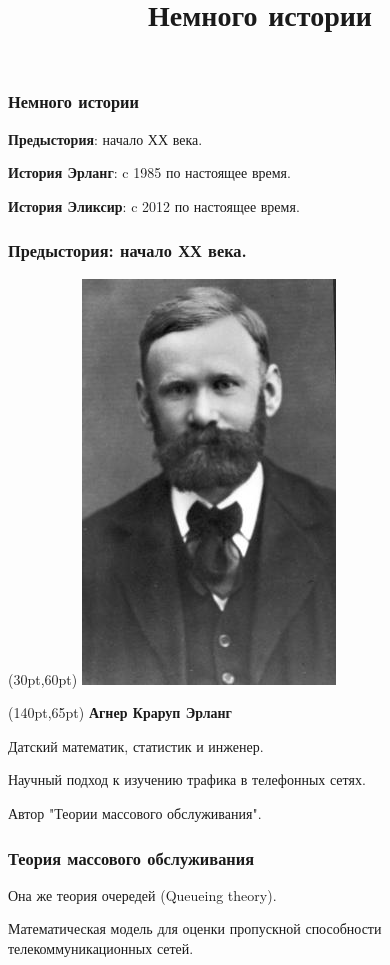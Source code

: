\documentclass[10pt]{beamer}
\title{Немного истории}
\begin{document}
\begin{frame}
  \frametitle{Немного истории}
  \textbf{Предыстория}: начало ХХ века.
  \par \bigskip
  \textbf{История Эрланг}: c 1985 по настоящее время.
  \par \bigskip
  \textbf{История Эликсир}: c 2012 по настоящее время.
\end{frame}


\begin{frame}
  \frametitle{Предыстория: начало ХХ века.}
  \begin{textblock*}{70pt}(30pt,60pt)
    \includegraphics[scale=1.3]{agner_krarup_erlang}
  \end{textblock*}
  \begin{textblock*}{220pt}(140pt,65pt)
    \textbf{Агнер Краруп Эрланг}
    \par \bigskip
    Датский математик, статистик и инженер.
    \par \bigskip
    Научный подход к изучению трафика в телефонных сетях.
    \par \bigskip
    Автор "Теории массового обслуживания".
  \end{textblock*}
\end{frame}

\begin{frame}
  \frametitle{Теория массового обслуживания}
  Она же теория очередей (Queueing theory).
  \par \bigskip
  Математическая модель для оценки пропускной способности телекоммуникационных сетей.
\end{frame}
\end{document}
